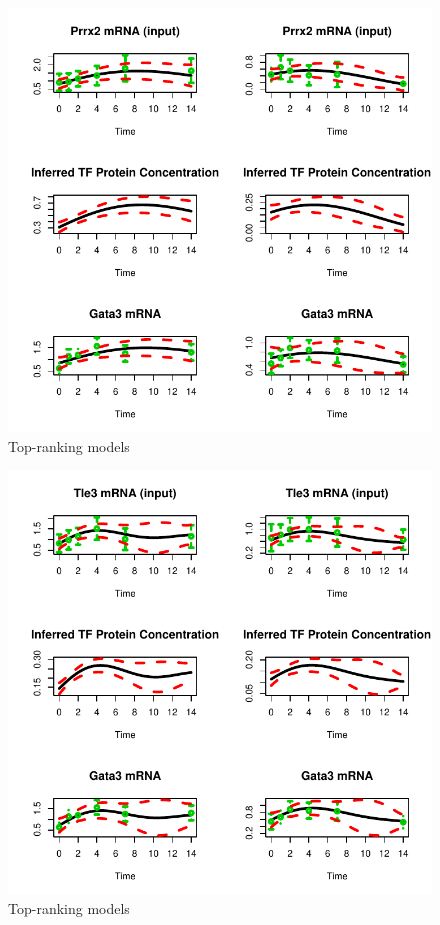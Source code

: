 \documentclass{article}
\begin{document}
\begin{figure}[htb]
  \centering
  \includegraphics[width=\columnwidth]{gpdisim_Prrx2_Gata3}
  \caption{Top-ranking models }
  \label{fig:model1}
\end{figure}

\begin{figure}[htb]
  \centering
  \includegraphics[width=\columnwidth]{gpdisim_Tle3_Gata3}
  \caption{Top-ranking models}
  \label{fig:model2}
\end{figure}
\end{document}
